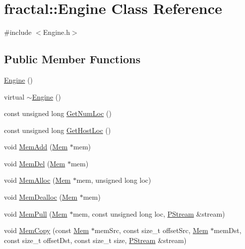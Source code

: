 \hypertarget{classfractal_1_1Engine}{\section{fractal\+:\+:Engine Class Reference}
\label{classfractal_1_1Engine}
}


{\ttfamily \#include $<$Engine.\+h$>$}

\subsection*{Public Member Functions}
\begin{DoxyCompactItemize}
\item 
\hyperlink{classfractal_1_1Engine_ae243fa407c42334a5863492b11dfa941}{Engine} ()
\item 
virtual \hyperlink{classfractal_1_1Engine_a1e9273ab68b6f3d204fe470d1817d304}{$\sim$\+Engine} ()
\item 
const unsigned long \hyperlink{classfractal_1_1Engine_a7cdb2977899a112b465f4dbc23e1fd7f}{Get\+Num\+Loc} ()
\item 
const unsigned long \hyperlink{classfractal_1_1Engine_adc5826324465c211533c9899243bcb60}{Get\+Host\+Loc} ()
\item 
void \hyperlink{classfractal_1_1Engine_a4dbcb6afa39e3d50e30533563c575e8e}{Mem\+Add} (\hyperlink{classfractal_1_1Mem}{Mem} $\ast$mem)
\item 
void \hyperlink{classfractal_1_1Engine_a62a9540deeaab0ecf37509b3b8807940}{Mem\+Del} (\hyperlink{classfractal_1_1Mem}{Mem} $\ast$mem)
\item 
void \hyperlink{classfractal_1_1Engine_a17bcae32ab712a4b5e6a80fbaf229596}{Mem\+Alloc} (\hyperlink{classfractal_1_1Mem}{Mem} $\ast$mem, unsigned long loc)
\item 
void \hyperlink{classfractal_1_1Engine_a1d7b634924ee719da26505940ec1cb94}{Mem\+Dealloc} (\hyperlink{classfractal_1_1Mem}{Mem} $\ast$mem)
\item 
void \hyperlink{classfractal_1_1Engine_a455fb7b51e838f09bfedf7915c25cadc}{Mem\+Pull} (\hyperlink{classfractal_1_1Mem}{Mem} $\ast$mem, const unsigned long loc, \hyperlink{classfractal_1_1PStream}{P\+Stream} \&stream)
\item 
void \hyperlink{classfractal_1_1Engine_a0459bc0fb6fcf39f8dccbd0f0ceb0446}{Mem\+Copy} (const \hyperlink{classfractal_1_1Mem}{Mem} $\ast$mem\+Src, const size\+\_\+t offset\+Src, \hyperlink{classfractal_1_1Mem}{Mem} $\ast$mem\+Dst, const size\+\_\+t offset\+Dst, const size\+\_\+t size, \hyperlink{classfractal_1_1PStream}{P\+Stream} \&stream)

\end{DoxyCompactItemize}
